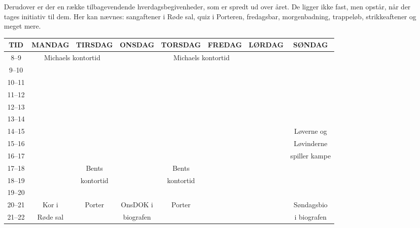 \documentclass[11pt,article,twoside,openany,danish,extrafontsizes]{memoir} %
\begin{document}
Derudover er der en række tilbagevendende hverdagsbegivenheder, som er spredt ud over året. De ligger ikke fast, men opstår, når der tages initiativ til dem. Her kan nævnes: sangaftener i Røde sal, quiz i Porteren, fredagsbar, morgenbadning, trappeløb, strikkeaftener og meget mere.

\begin{landscape}
\begin{table}[p]
\begin{center}
\begin{tabular}{|>{\sffamily}c|c|c|c|c|c|c|c|}
\hline
\textsf{TID}		&	\textsf{MANDAG}	& \textsf{TIRSDAG}	& \textsf{ONSDAG}	& \textsf{TORSDAG}	& \textsf{FREDAG}	& \textsf{LØRDAG}	& \textsf{SØNDAG} \\ \hline
\rowcolor{SG-dark!10} 8--9	& \multicolumn{2}{|c|}{Michaels kontortid}	& & \multicolumn{2}{|c|}{Michaels kontortid} & & \\ \hline
\rowcolor{SG-dark!05} 9--10	& & & & & & & \\ \hline
\rowcolor{SG-dark!10} 10--11	& & & & & & & \\ \hline
\rowcolor{SG-dark!15} 11--12	& & & & & & & \\ \hline
\rowcolor{SG-dark!20} 12--13	& & & & & & & \\ \hline
\rowcolor{SG-dark!25} 13--14	& & & & & & & \\ \hline
\rowcolor{SG-dark!30} 14--15	& & & & & & & Løverne og \\ \cline{1-7}
\rowcolor{SG-dark!35} 15--16	& & & & & & & Løvinderne \\ \cline{1-7}
\rowcolor{SG-dark!40} 16--17	& & & & & & & spiller kampe \\ \hline
\rowcolor{SG-dark!45} 17--18	& & Bents & & Bents & & & \\ \cline{1-2} \cline{4-4} \cline{6-8}
\rowcolor{SG-dark!50} 18--19	& & kontortid & & kontortid & & & \\ \hline
\rowcolor{SG-dark!55} 19--20	& & & & & & & \\ \hline
\rowcolor{SG-dark!60} 20--21	& Kor i & Porter & OnsDOK i & Porter & & & Søndagsbio \\ \cline{1-1} \cline{6-8}
\rowcolor{SG-dark!65} 21--22	& Røde sal & & biografen & & & & i biografen \\ \hline
\end{tabular}
\end{center}
\end{table}
\end{landscape}
\end{document}
